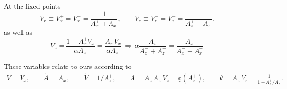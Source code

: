 \documentclass{article}
\begin{document}
At the fixed points
\begin{equation}
    V_x \equiv V_x^+ = V_x^- = \frac{1}{A_x^+ + A_x^-}, \qquad
    V_z \equiv V_z^+ = V_z^- = \frac{1}{A_z^+ + A_z^-}.
\end{equation}
as well as
\begin{equation}
    V_z = \frac{1 - A_x^+ V_x}{\alpha A_z^-} = \frac{A_x^- V_x}{\alpha
        A_z^-} \, \Rightarrow \, \alpha \frac{A_z^-}{A_z^- + A_z^+} =
        \frac{A_x^-}{A_x^- + A_x^+}
\end{equation}

These variables relate to ours according to
\begin{align}
    V = V_x, \qquad \tilde{A} = A_x^-, \qquad
    \tilde{V} = 1 / A_z^+, \qquad A = A_z^- A_z^+ V_z = \mathbb{g} (A_z^+), \qquad
    \theta = A_z^- V_z = \frac{1}{1 + A_z^+ / A_z^-}.
\end{align}
\end{document}
